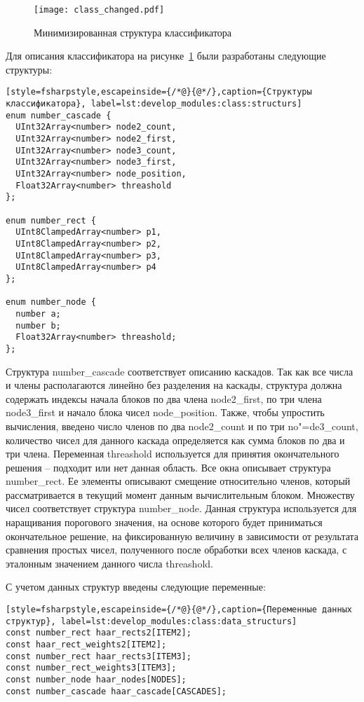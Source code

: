 \begin{figure}[ht]
\centering
  \texttt{[image: class\_changed.pdf]}
  \caption{ Минимизированная структура классификатора }
  \label{fig:develop_modules:class:class_changed}
\end{figure}

\newpage

Для описания классификатора на рисунке~\ref{fig:develop_modules:class:class_changed} были разработаны следующие структуры:
\begin{lstlisting}[style=fsharpstyle,escapeinside={/*@}{@*/},caption={Структуры классификатора}, label=lst:develop_modules:class:structurs]
enum number_cascade {
  UInt32Array<number> node2_count,
  UInt32Array<number> node2_first,
  UInt32Array<number> node3_count,
  UInt32Array<number> node3_first,
  UInt32Array<number> node_position,
  Float32Array<number> threashold
};

enum number_rect {
  UInt8ClampedArray<number> p1,
  UInt8ClampedArray<number> p2,
  UInt8ClampedArray<number> p3,
  UInt8ClampedArray<number> p4
};

enum number_node {
  number a;
  number b;
  Float32Array<number> threashold;
};
\end{lstlisting}

Структура number\_cascade соответствует описанию каскадов. Так как все числа и члены располагаются линейно без разделения на каскады, структура должна содержать индексы начала блоков по два члена node2\_first, по три члена node3\_first и начало блока чисел node\_position. Также, чтобы упростить вычисления, введено число членов по два node2\_count и по три no"=de3\_count, количество чисел для данного каскада определяется как сумма блоков по два и три члена. Переменная threashold используется для принятия окончательного решения – подходит или нет данная область.
Все окна описывает структура number\_rect. Ее элементы описывают смещение относительно членов, который рассматривается в текущий момент данным вычислительным блоком.
Множеству чисел соответствует структура number\_node. Данная структура используется для наращивания порогового значения, на основе которого будет приниматься окончательное решение, на фиксированную величину в зависимости от результата сравнения простых чисел, полученного после обработки всех членов каскада, с эталонным значением данного числа threashold.

С учетом данных структур введены следующие переменные:

\begin{lstlisting}[style=fsharpstyle,escapeinside={/*@}{@*/},caption={Переменные данных структур}, label=lst:develop_modules:class:data_structurs]
const number_rect haar_rects2[ITEM2];
const haar_rect_weights2[ITEM2];
const number_rect haar_rects3[ITEM3];
const number_rect_weights3[ITEM3];
const number_node haar_nodes[NODES];
const number_cascade haar_cascade[CASCADES];
\end{lstlisting}

